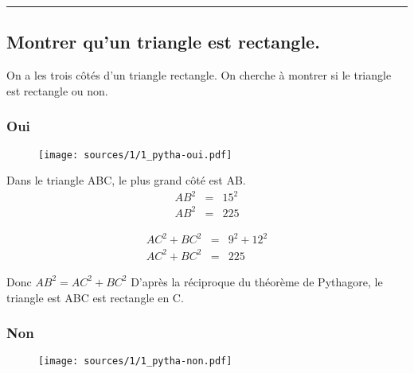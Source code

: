 \documentclass[12pt]{article}
\newcommand{\horrule}[1]{\rule{\linewidth}{#1}} %
\begin{document}
\vspace{-0.5cm}
\horrule{1px}
\vspace{-1cm}

\subsection*{Montrer qu'un triangle est rectangle.}

On a les trois côtés d'un triangle rectangle. On cherche à montrer si le triangle est rectangle ou non.

\begin{multicols}{2}

  \subsubsection*{Oui}

  \begin{multicols}{2}

    \begin{figure}[H]
      \centering
      \texttt{[image: sources/1/1\_pytha-oui.pdf]}
    \end{figure}

    Dans le triangle ABC, le plus grand côté est AB.
    \begin{eqnarray*}
      AB^2 &=& 15^2 \\
      AB^2 &=& 225
    \end{eqnarray*}

    \begin{eqnarray*}
      AC^2 + BC^2 &=& 9^2 + 12^2 \\
      AC^2 + BC^2 &=& 225
    \end{eqnarray*}

    Donc $AB^2 = AC^2 + BC^2$
    D'après la réciproque du théorème de Pythagore, le triangle est ABC est rectangle en C.

  \end{multicols}

  \subsubsection*{Non}

  \begin{multicols}{2}


    \begin{figure}[H]
      \centering
      \texttt{[image: sources/1/1\_pytha-non.pdf]}
    \end{figure}


\end{multicols}
\end{multicols}
\end{document}
